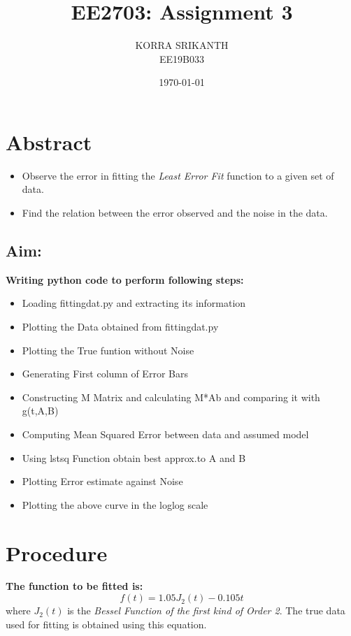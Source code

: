 \documentclass[11pt, a4paper]{article}
\title{EE2703: Assignment 3} %
\author{KORRA SRIKANTH\\{\small EE19B033}} %
\date{\today} %
\begin{document}
    \maketitle %

    \section{Abstract}
    \begin{itemize}
 \item Observe the error in fitting the \textit{Least Error Fit} function to a given set of data.
\item Find the relation between the error observed and the noise in the data.
        \end{itemize}
    
         \subsection{Aim:}
         \textbf {Writing python code to perform following steps:}
        \begin{itemize}
         \item Loading fittingdat.py and extracting its information
         \item Plotting the Data obtained from fittingdat.py 
         \item Plotting the True funtion without Noise
         \item Generating First column of Error Bars
         \item Constructing M Matrix and calculating M*Ab and comparing it         with g(t,A,B)
         \item Computing Mean Squared Error between data and assumed model
         \item Using lstsq Function obtain best approx.to A and B
         \item Plotting Error estimate against Noise
         \item Plotting the above curve in the loglog scale
        \end{itemize}
        

    \section{Procedure}
       \textbf {The function to be fitted is:}
        \begin{equation}
            f(t) = 1.05J_2(t)-0.105t
        \end{equation}
        where $J_2(t)$ is the \textit{Bessel Function of the first kind of Order 2}. The true data used for fitting is obtained using this equation.
\end{document}
